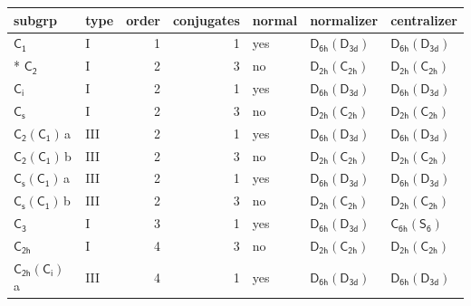 \documentclass[10pt,a4paper]{article}
\numberwithin{equation}{section}
\newcommand{\grp}[1]{\mathsf{#1}}
\newcommand{\clsletter}[1]{\,{\scriptsize\color{black!55}#1}}
\begin{document}
{\small\begin{longtable}{@{}llrrlll@{}}\toprule
subgrp & type & order & conjugates & normal & normalizer & centralizer\\\midrule\endhead
\bottomrule\endfoot\endlastfoot
\href{../../../rotation/data/pdf/C1.pdf}{$\grp{C_{1}}$} & I & 1 & 1 & yes & \href{D6h-D3d.pdf}{$\grp{D_{6h}}(\grp{D_{3d}})$} & \href{D6h-D3d.pdf}{$\grp{D_{6h}}(\grp{D_{3d}})$}\\*
\href{../../../rotation/data/pdf/C2.pdf}{$\grp{C_{2}}$} & I & 2 & 3 & no & \href{D2h-C2h.pdf}{$\grp{D_{2h}}(\grp{C_{2h}})$} & \href{D2h-C2h.pdf}{$\grp{D_{2h}}(\grp{C_{2h}})$}\\
\href{../../../rotation/data/pdf/S2.pdf}{$\grp{C_{i}}$} & I & 2 & 1 & yes & \href{D6h-D3d.pdf}{$\grp{D_{6h}}(\grp{D_{3d}})$} & \href{D6h-D3d.pdf}{$\grp{D_{6h}}(\grp{D_{3d}})$}\\
\href{../../../rotation/data/pdf/C1v.pdf}{$\grp{C_{s}}$} & I & 2 & 3 & no & \href{D2h-C2h.pdf}{$\grp{D_{2h}}(\grp{C_{2h}})$} & \href{D2h-C2h.pdf}{$\grp{D_{2h}}(\grp{C_{2h}})$}\\
\href{C2-C1.pdf}{$\grp{C_{2}}(\grp{C_{1}})$}\clsletter{a} & III & 2 & 1 & yes & \href{D6h-D3d.pdf}{$\grp{D_{6h}}(\grp{D_{3d}})$} & \href{D6h-D3d.pdf}{$\grp{D_{6h}}(\grp{D_{3d}})$}\\
\href{C2-C1.pdf}{$\grp{C_{2}}(\grp{C_{1}})$}\clsletter{b} & III & 2 & 3 & no & \href{D2h-C2h.pdf}{$\grp{D_{2h}}(\grp{C_{2h}})$} & \href{D2h-C2h.pdf}{$\grp{D_{2h}}(\grp{C_{2h}})$}\\
\href{C1v-C1.pdf}{$\grp{C_{s}}(\grp{C_{1}})$}\clsletter{a} & III & 2 & 1 & yes & \href{D6h-D3d.pdf}{$\grp{D_{6h}}(\grp{D_{3d}})$} & \href{D6h-D3d.pdf}{$\grp{D_{6h}}(\grp{D_{3d}})$}\\
\href{C1v-C1.pdf}{$\grp{C_{s}}(\grp{C_{1}})$}\clsletter{b} & III & 2 & 3 & no & \href{D2h-C2h.pdf}{$\grp{D_{2h}}(\grp{C_{2h}})$} & \href{D2h-C2h.pdf}{$\grp{D_{2h}}(\grp{C_{2h}})$}\\
\href{../../../rotation/data/pdf/C3.pdf}{$\grp{C_{3}}$} & I & 3 & 1 & yes & \href{D6h-D3d.pdf}{$\grp{D_{6h}}(\grp{D_{3d}})$} & \href{C6h-S6.pdf}{$\grp{C_{6h}}(\grp{S_{6}})$}\\
\href{../../../rotation/data/pdf/C2h.pdf}{$\grp{C_{2h}}$} & I & 4 & 3 & no & \href{D2h-C2h.pdf}{$\grp{D_{2h}}(\grp{C_{2h}})$} & \href{D2h-C2h.pdf}{$\grp{D_{2h}}(\grp{C_{2h}})$}\\
\href{C2h-S2.pdf}{$\grp{C_{2h}}(\grp{C_{i}})$}\clsletter{a} & III & 4 & 1 & yes & \href{D6h-D3d.pdf}{$\grp{D_{6h}}(\grp{D_{3d}})$} & \href{D6h-D3d.pdf}{$\grp{D_{6h}}(\grp{D_{3d}})$}\\

\end{longtable}}
\end{document}
